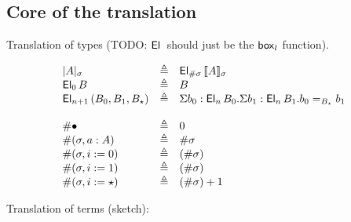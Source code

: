 \documentclass{article}
\newcommand{\defeq}{\triangleq}
\begin{document}
\subsection{Core of the translation}

Translation of types (TODO: $\mathsf{El}_{}\,$ should just be the $\mathsf{box}_{l}$ function).

$$
\begin{array}{lcll}
\semtypenew{\sigma}{A} & \defeq & \elt{\#\sigma}{\semnew{\sigma}{A}}\\
\elt{0}{B} & \defeq & B\\
\elt{n+1}{(B_0,B_1,B_\star)} & \defeq & 
  \Sigma b_0:\elt{n}{B_0}.
  \Sigma b_1:\elt{n}{B_1}.
  b_0 =_{B_\star} b_1\\
\\
\# \emptysigma & \defeq & 0\\
\# (\sigma,a:A) & \defeq & \#\sigma\\
\# (\sigma,i:=0) & \defeq & (\#\sigma)\\
\# (\sigma,i:=1) & \defeq & (\#\sigma)\\
\# (\sigma,i:=\star) & \defeq & (\#\sigma) + 1\\
\end{array}
$$

\noindent Translation of terms (sketch):
\end{document}

